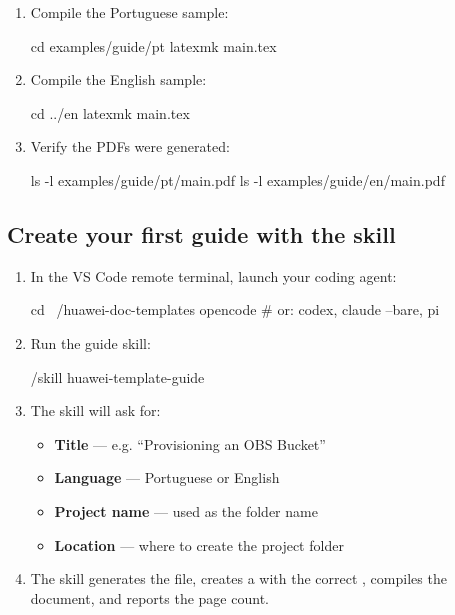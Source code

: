 \documentclass{guide}
\begin{document}
\stepbystep
\begin{enumerate}
  \item Compile the Portuguese sample:

  \begin{code}[bash]
cd examples/guide/pt
latexmk main.tex
  \end{code}

  \item Compile the English sample:

  \begin{code}[bash]
cd ../en
latexmk main.tex
  \end{code}

  \item Verify the PDFs were generated:

  \begin{code}[bash]
ls -l examples/guide/pt/main.pdf
ls -l examples/guide/en/main.pdf
  \end{code}
\end{enumerate}

\subsection{Create your first guide with the skill}

\stepbystep
\begin{enumerate}
  \item In the VS Code remote terminal, launch your coding agent:

  \begin{code}[bash]
cd ~/huawei-doc-templates
opencode          # or: codex, claude --bare, pi
  \end{code}

  \item Run the guide skill:

  \begin{code}
/skill huawei-template-guide
  \end{code}

  \item The skill will ask for:
    \begin{itemize}
      \item \textbf{Title} — e.g. ``Provisioning an OBS Bucket''
      \item \textbf{Language} — Portuguese or English
      \item \textbf{Project name} — used as the folder name
      \item \textbf{Location} — where to create the project folder
    \end{itemize}

  \item The skill generates the  file, creates a
         with the correct , compiles the
        document, and reports the page count.

\end{enumerate}
\end{document}
